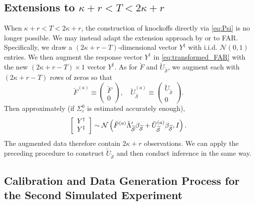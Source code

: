 ﻿\documentclass[12pt]{article}
\newcommand{\0}{\mbox{\bf 0}}
\theoremstyle{plain}%
\theoremstyle{definition}
\begin{document}
{{\simqoneexpone
\simqoneexptwo
}


\subsection{Extensions to $\kappa+r<T<2\kappa +r$}
 
When $\kappa+r<T<2\kappa +r$, the construction of knockoffs directly via %
\eqref{eq:Psi} is no longer possible. We may instead adapt the extension
approach by \citet{BarberCandes2015} or \citet{LiuSunKe2024} to
FAR. Specifically, we draw a $(2\kappa+r -T)$-dimensional vector $%
Y^{\ddagger}$ with i.i.d. $\mathcal{N}(0,1)$ entries. We then augment the
response vector $Y^{\dagger}$ in \eqref{eq:transformed_FAR} with the new $%
(2\kappa+r -T) \times 1$ vector $Y^{\ddagger}$. As for $\breve{F}$ and $%
\breve{U}_{\widetilde{\mathcal{S}}}$, we augment each with $(2\kappa+r -T)$
rows of zeros so that 
\begin{equation*}
\breve{F}^{(a)} \equiv \left( 
\begin{array}{c}
\breve{F} \\ 
0%
\end{array}
\right), \quad \breve{U}^{(a)}_{\widetilde{\mathcal{S}}} \equiv \left( 
\begin{array}{c}
\breve{U}_{\widetilde{\mathcal{S}}} \\ 
0%
\end{array}
\right).
\end{equation*}
Then approximately (if $\Sigma _{\varepsilon }^{0}$ is estimated accurately
enough), 
\begin{equation*}
\left[%
\begin{array}{c}
Y^{\dagger} \\ 
Y^{\ddagger}%
\end{array}%
\right] \sim \mathcal{N}\left(\breve{F}^{(a)}\breve{\Lambda}_{\widetilde{%
\mathcal{S}}}^{\prime }\beta _{\widetilde{\mathcal{S}}}+\breve{U}^{(a)}_{%
\widetilde{\mathcal{S}}}\beta _{\widetilde{\mathcal{S}}}, I \right) .
\end{equation*}
{\color{minorrevisionred}The augmented data therefore contain $2\kappa+r$
observations. We can apply the preceding procedure to construct
$\widetilde{U}_{\widetilde{\mathcal S}}$ and then conduct inference in the
same way.}
 

\subsection{Calibration and Data Generation Process for the Second Simulated Experiment}\label{sec:calibration}

}
\end{document}
